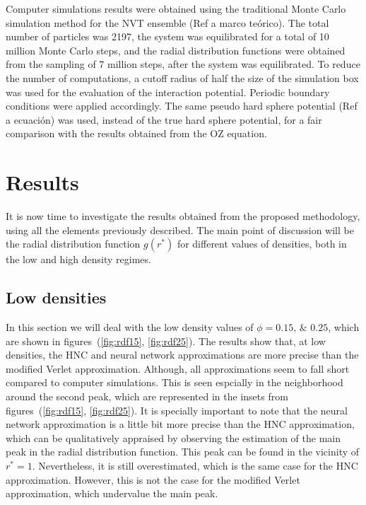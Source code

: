 Computer simulations results were obtained using the traditional Monte Carlo simulation
method for the NVT ensemble (Ref a marco teórico). The total number of particles was 2197,
the system was equilibrated for a total of 10 million Monte Carlo steps, and the radial
distribution functions were obtained from the sampling of 7 million steps, after
the system was equilibrated. To reduce the number of computations, a cutoff radius of
half the size of the simulation box was used for the evaluation of the interaction 
potential. Periodic boundary conditions were applied accordingly. The same pseudo hard 
sphere potential (Ref a ecuación) was used, instead of the true hard sphere potential, for 
a fair comparison with the results obtained from the OZ equation.

\section{Results}
It is now time to investigate the results obtained from the proposed methodology, using all the elements previously described.
The main point of discussion will be the radial distribution
function \textemdash $g(r^*)$ \textemdash for different values of densities, both in the
low and high density regimes.

\subsection{Low densities}
In this section we will deal with the low 
density values of $\phi=\numlist[list-pair-separator={\enspace\text{and}\enspace}]{0.15;0.25}$, which are shown in figures~(\ref{fig:rdf15}, \ref{fig:rdf25}).
The results show that, at low densities, the HNC and neural network approximations are
more precise than the modified Verlet approximation. Although, all
approximations seem to fall short compared to computer simulations. This is seen espcially
in the neighborhood around the second peak, which are represented in the insets from
figures~(\ref{fig:rdf15}, \ref{fig:rdf25}).
It is specially important to note that the neural network approximation is a little bit 
more precise than the HNC approximation, which can be qualitatively appraised by observing 
the estimation of the main peak in the radial distribution function. This peak can be found 
in the vicinity of $r^* = 1$. Nevertheless, it is still overestimated, which is the 
same case for the HNC approximation. However, this is not the case for the modified Verlet 
approximation, which undervalue the main peak.

